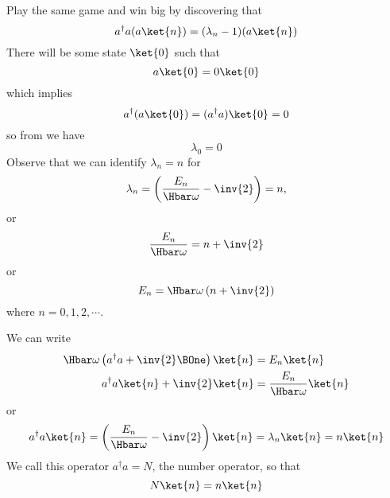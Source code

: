 Play the same game and win big by discovering that
%
\begin{equation}\label{eqn:PHY356FLecture11:110}
a^\dagger a ( a \ket{n} ) = (\lambda_n -1) (a \ket{n} )
\end{equation}
%
There will be some state \(\ket{0}\) such that
%
\begin{equation}\label{eqn:PHY356FLecture11:120}
a \ket{0} = 0 \ket{0}
\end{equation}
%
which implies
\begin{equation}\label{eqn:PHY356FLecture11:130}
a^\dagger (a \ket{0}) = (a^\dagger a) \ket{0} = 0
\end{equation}
%
so from  we have
%
\begin{equation}\label{eqn:PHY356FLecture11:140}
\lambda_0 = 0
\end{equation}
%
Observe that we can identify \(\lambda_n = n\) for
%
\begin{equation}\label{eqn:PHY356FLecture11:150}
\lambda_n = \left( \frac{E_n}{\Hbar\omega} - \inv{2} \right) = n,
\end{equation}
%
or
\begin{equation}\label{eqn:PHY356FLecture11:155}
\frac{E_n}{\Hbar\omega} = n + \inv{2}
\end{equation}
%
or
\begin{equation}\label{eqn:PHY356FLecture11:160}
E_n = \Hbar \omega \left( n + \inv{2} \right)
\end{equation}
%
where \(n = 0, 1, 2, \cdots\).

We can write
%
\begin{equation}\label{eqn:lecture11harmonicOscillator:720}
\begin{aligned}
\Hbar \omega \left( a^\dagger a + \inv{2} \BOne \right) \ket{n} &= E_n \ket{n} \\
a^\dagger a \ket{n} + \inv{2} \ket{n} &= \frac{E_n}{\Hbar \omega} \ket{n} \\
\end{aligned}
\end{equation}
%
or
\begin{equation}\label{eqn:PHY356FLecture11:170}
a^\dagger a \ket{n} = \left( \frac{E_n}{\Hbar \omega} - \inv{2} \right) \ket{n} = \lambda_n \ket{n} = n \ket{n}
\end{equation}
%
We call this operator \(a^\dagger a = N\), the number operator, so that
%
\begin{equation}\label{eqn:PHY356FLecture11:180}
N \ket{n} = n \ket{n}
\end{equation}
%

